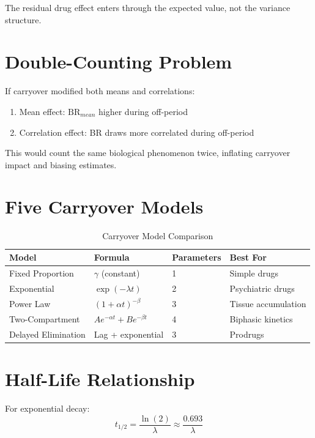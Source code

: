 \documentclass[11pt]{article}
\theoremstyle{definition}
\begin{document}
The residual drug effect enters through the expected value, not the variance
structure.

\section{Double-Counting Problem}

If carryover modified both means and correlations:
\begin{enumerate}
    \item Mean effect: $\text{BR}_{mean}$ higher during off-period
    \item Correlation effect: BR draws more correlated during off-period
\end{enumerate}

This would count the same biological phenomenon twice, inflating carryover
impact and biasing estimates.

\section{Five Carryover Models}

\begin{table}[h]
\centering
\caption{Carryover Model Comparison}
\begin{tabular}{@{}llll@{}}
\toprule
\textbf{Model} & \textbf{Formula} & \textbf{Parameters} & \textbf{Best For} \\
\midrule
Fixed Proportion & $\gamma$ (constant) & 1 & Simple drugs \\
Exponential & $\exp(-\lambda t)$ & 2 & Psychiatric drugs \\
Power Law & $(1+\alpha t)^{-\beta}$ & 3 & Tissue accumulation \\
Two-Compartment & $Ae^{-\alpha t} + Be^{-\beta t}$ & 4 & Biphasic kinetics \\
Delayed Elimination & Lag + exponential & 3 & Prodrugs \\
\bottomrule
\end{tabular}
\end{table}

\section{Half-Life Relationship}

For exponential decay:
\begin{equation}
t_{1/2} = \frac{\ln(2)}{\lambda} \approx \frac{0.693}{\lambda}
\end{equation}
\end{document}
